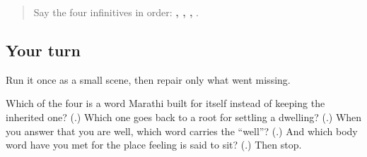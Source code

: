 \begin{quote}
Say the four infinitives in order: \textbf{, , , }.
\end{quote}

\subsection*{Your turn}
Run it once as a small scene, then repair only what went missing.

\begin{tcolorbox}[breakable,colback=teal!4,colframe=teal!35!black,title={Before you move on}]
Which of the four is a word Marathi built for itself instead of keeping the inherited one? (\textbf{}.) Which one goes back to a root for settling a dwelling? (\textbf{}.) When you answer that you are well, which word carries the \textquotedblleft{}well\textquotedblright{}? (\textbf{}.) And which body word have you met for the place feeling is said to sit? (\textbf{}.) Then stop.
\end{tcolorbox}
